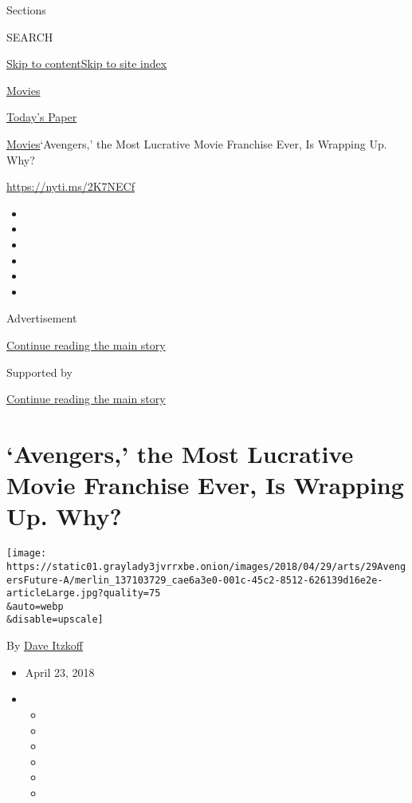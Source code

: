 Sections

SEARCH

\protect\hyperlink{site-content}{Skip to
content}\protect\hyperlink{site-index}{Skip to site index}

\href{https://www.nytimes3xbfgragh.onion/section/movies}{Movies}

\href{https://myaccount.nytimes3xbfgragh.onion/auth/login?response_type=cookie\&client_id=vi}{}

\href{https://www.nytimes3xbfgragh.onion/section/todayspaper}{Today's
Paper}

\href{/section/movies}{Movies}\textbar{}`Avengers,' the Most Lucrative
Movie Franchise Ever, Is Wrapping Up. Why?

\url{https://nyti.ms/2K7NECf}

\begin{itemize}
\item
\item
\item
\item
\item
\item
\end{itemize}

Advertisement

\protect\hyperlink{after-top}{Continue reading the main story}

Supported by

\protect\hyperlink{after-sponsor}{Continue reading the main story}

\hypertarget{avengers-the-most-lucrative-movie-franchise-ever-is-wrapping-up-why}{%
\section{`Avengers,' the Most Lucrative Movie Franchise Ever, Is
Wrapping Up.
Why?}\label{avengers-the-most-lucrative-movie-franchise-ever-is-wrapping-up-why}}

\texttt{[image: https://static01.graylady3jvrrxbe.onion/images/2018/04/29/arts/29AvengersFuture-A/merlin\_137103729\_cae6a3e0-001c-45c2-8512-626139d16e2e-articleLarge.jpg?quality=75\\\&auto=webp\\\&disable=upscale]}

By \href{http://www.nytimes3xbfgragh.onion/by/dave-itzkoff}{Dave
Itzkoff}

\begin{itemize}
\item
  April 23, 2018
\item
  \begin{itemize}
  \item
  \item
  \item
  \item
  \item
  \item
  \end{itemize}
\end{itemize}

